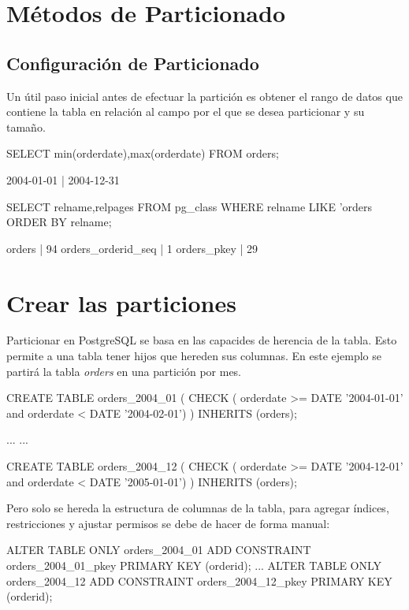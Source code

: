 \section{Métodos de Particionado}

\subsection{Configuración de Particionado}

Un útil paso inicial antes de efectuar la partición es obtener el rango de datos que contiene la tabla en relación al campo por el que se desea particionar y su tamaño.\\

\begin{pyglist}
SELECT min(orderdate),max(orderdate) FROM orders;

2004-01-01 | 2004-12-31

SELECT relname,relpages FROM pg_class WHERE relname LIKE 'orders%
ORDER BY relname;

 orders             |       94
 orders_orderid_seq |        1
 orders_pkey        |       29

\end{pyglist}

\section{Crear las particiones}

Particionar en PostgreSQL se basa en las capacides de herencia de la tabla. Esto permite a una tabla tener hijos que hereden sus columnas. En este ejemplo se partirá la tabla \textit{orders} en una partición por mes.\\

\begin{pyglist}
CREATE TABLE orders_2004_01 (
CHECK ( orderdate >= DATE '2004-01-01' and orderdate < DATE '2004-02-01')
) INHERITS (orders);

...
...

CREATE TABLE orders_2004_12 (
CHECK ( orderdate >= DATE '2004-12-01' and orderdate < DATE '2005-01-01')
) INHERITS (orders);
\end{pyglist}

Pero solo se hereda la estructura de columnas de la tabla, para agregar índices, restricciones y ajustar permisos se debe de hacer de forma manual:\\

\begin{pyglist}
ALTER TABLE ONLY orders_2004_01
ADD CONSTRAINT orders_2004_01_pkey PRIMARY KEY (orderid);
...
ALTER TABLE ONLY orders_2004_12
ADD CONSTRAINT orders_2004_12_pkey PRIMARY KEY (orderid);
\end{pyglist}

